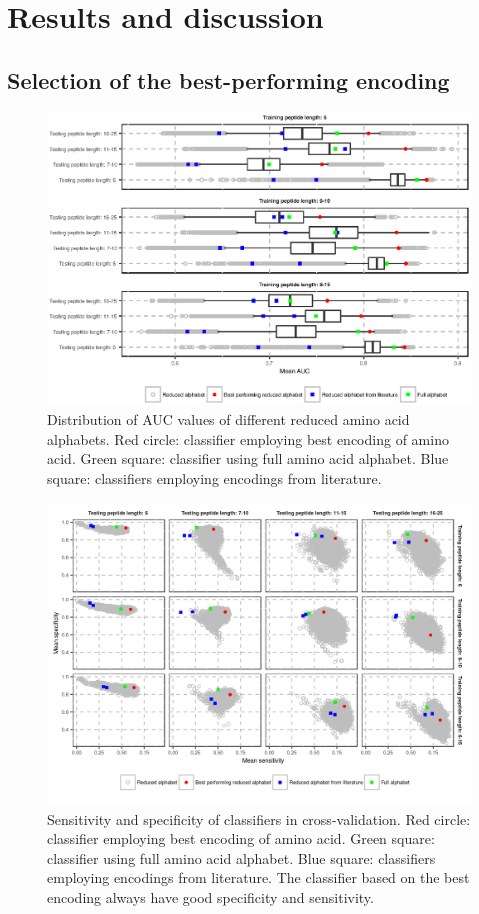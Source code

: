 \documentclass{bioinfo}
\begin{document}
\section{Results and discussion}

\subsection{Selection of the best-performing encoding}

\begin{figure}[!tpb]
\centerline{\includegraphics{figures/AUC_boxplot.eps}}
\caption{Distribution of AUC values of different reduced amino acid alphabets. 
Red circle: classifier employing best encoding of amino acid. Green square: 
classifier using full amino acid alphabet. Blue square: classifiers employing 
encodings from literature.}\label{fig:AUC_boxplot} 
\end{figure}

\begin{figure}[!tpb]
\centerline{\includegraphics{figures/sesp_plot.png}}
\caption{Sensitivity and specificity of classifiers in cross-validation. Red 
circle: classifier employing best encoding of amino acid. Green square: 
classifier using full amino acid alphabet. Blue square: classifiers employing 
encodings from literature. The classifier based on the best encoding always 
have 
good specificity and sensitivity.}\label{fig:sesp_plot}
\end{figure}
\end{document}
